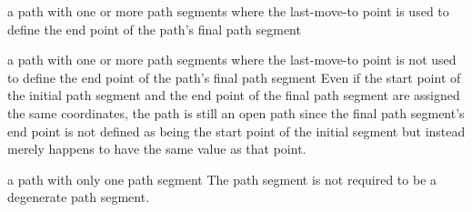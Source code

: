 a path with one or more path segments where the last-move-to point is used to define the end point of the path's final path segment

a path with one or more path segments where the last-move-to point is not used to define the end point of the path's final path segment
\enternote
Even if the start point of the initial path segment and the end point of the final path segment are assigned the same coordinates, the path is still an open path since the final path segment's end point is not defined as being the start point of the initial segment but instead merely happens to have the same value as that point.
\exitnote

a path with only one path segment
\enternote
The path segment is not required to be a degenerate path segment.
\exitnote

